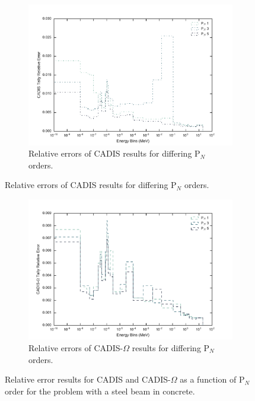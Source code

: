 \begin{figure}[htb!]
  \centering
  \begin{subfigure}[t]{\textwidth}
    \centering
    \includegraphics[width=\linewidth]{./chapters/characterization_probs/figures/angle/prob_1/err_pN_cadis.pdf}
    \caption{Relative errors of CADIS results for differing P$_N$ orders.}
    \label{fig:pn_cad_err}
  \end{subfigure}
\end{figure}
\begin{figure}[htb!]\ContinuedFloat
  \centering
  \begin{subfigure}[t]{\textwidth}
    \centering
    \includegraphics[width=\linewidth]{./chapters/characterization_probs/figures/angle/prob_1/err_pN_cadisangle.pdf}
    \caption{Relative errors of CADIS-$\Omega$ results for differing P$_N$
    orders.}
    \label{fig:pn_cadangle_err}
  \end{subfigure}
  \caption[Relative error results for CADIS and CADIS-$\Omega$ as a function of
  P$_N$ order for the problem with a steel beam in concrete.]
  {Relative error results for CADIS and CADIS-$\Omega$ as a function of
  P$_N$ order for the problem with a steel beam in concrete.}
\end{figure}


